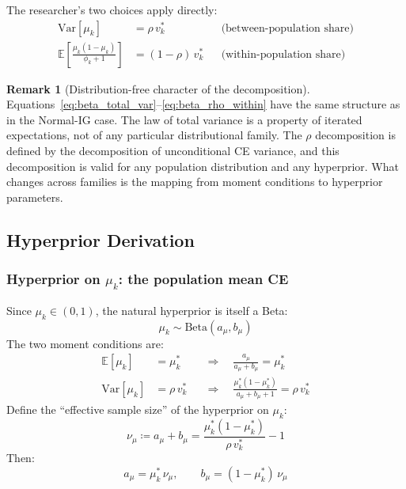 \documentclass[11pt,a4paper]{article}
\theoremstyle{definition}
\newtheorem{remark}[theorem]{Remark}
\newcommand{\E}{\mathbb{E}}
\newcommand{\Var}{\mathrm{Var}}
\begin{document}
The researcher's two choices apply directly:
\begin{align}
    \Var[\mu_k] &= \rho \, v_k^*
    && \text{(between-population share)}
    \label{eq:beta_rho_between} \\
    \E\!\left[\frac{\mu_k(1-\mu_k)}{\phi_k + 1}\right] &= (1-\rho) \, v_k^*
    && \text{(within-population share)}
    \label{eq:beta_rho_within}
\end{align}

\begin{remark}[Distribution-free character of the decomposition]
Equations~\eqref{eq:beta_total_var}--\eqref{eq:beta_rho_within} have the same
structure as in the Normal-IG case. The law of total variance is a property of
iterated expectations, not of any particular distributional family. The $\rho$
decomposition is defined by the decomposition of unconditional CE variance, and
this decomposition is valid for any population distribution and any hyperprior.
What changes across families is the mapping from moment conditions to
hyperprior parameters.
\end{remark}

\subsection{Hyperprior Derivation}

\subsubsection{Hyperprior on $\mu_k$: the population mean CE}

Since $\mu_k \in (0,1)$, the natural hyperprior is itself a Beta:
\begin{equation}
    \mu_k \sim \mathrm{Beta}(a_\mu, b_\mu)
\end{equation}
The two moment conditions are:
\begin{align}
    \E[\mu_k] &= \mu_k^*
    && \Longrightarrow \quad \frac{a_\mu}{a_\mu + b_\mu} = \mu_k^*
    \\[4pt]
    \Var[\mu_k] &= \rho \, v_k^*
    && \Longrightarrow \quad
    \frac{\mu_k^*(1-\mu_k^*)}{a_\mu + b_\mu + 1} = \rho \, v_k^*
\end{align}
Define the ``effective sample size'' of the hyperprior on $\mu_k$:
\begin{equation}
    \label{eq:nu_mu}
    \nu_\mu \coloneqq a_\mu + b_\mu
    = \frac{\mu_k^*(1-\mu_k^*)}{\rho \, v_k^*} - 1
\end{equation}
Then:
\begin{equation}
    \label{eq:beta_hyper_mu}
    a_\mu = \mu_k^* \, \nu_\mu, \qquad
    b_\mu = (1-\mu_k^*) \, \nu_\mu
\end{equation}
\end{document}
